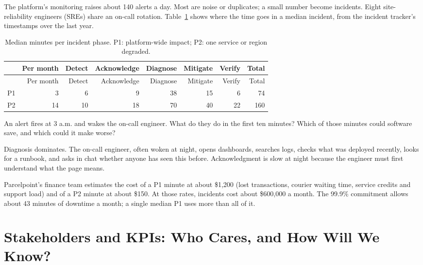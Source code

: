 The platform's monitoring raises about 140 alerts a day. Most are noise or duplicates; a small number become incidents. Eight site-reliability engineers (SREs) share an on-call rotation. Table~\ref{tab:inc-phases} shows where the time goes in a median incident, from the incident tracker's timestamps over the last year.

\begingroup
\small
\begin{longtable}{@{}lrrrrrrr@{}}
\caption{Median minutes per incident phase. P1: platform-wide impact; P2: one service or region degraded.}\label{tab:inc-phases}\\
\toprule
\rowcolor{coHead} & Per month & Detect & Acknowledge & Diagnose & Mitigate & Verify & Total \\
\midrule
\endfirsthead
\toprule
\rowcolor{coHead} & Per month & Detect & Acknowledge & Diagnose & Mitigate & Verify & Total \\
\midrule
\endhead
P1 & 3 & 6 & 9 & 38 & 15 & 6 & 74 \\
P2 & 14 & 10 & 18 & 70 & 40 & 22 & 160 \\
\bottomrule
\end{longtable}
\endgroup

\begin{thinkabout}
An alert fires at 3 a.m. and wakes the on-call engineer. What do they do in the first ten minutes? Which of those minutes could software save, and which could it make worse?
\end{thinkabout}

Diagnosis dominates. The on-call engineer, often woken at night, opens dashboards, searches logs, checks what was deployed recently, looks for a runbook, and asks in chat whether anyone has seen this before. Acknowledgment is slow at night because the engineer must first understand what the page means.

Parcelpoint's finance team estimates the cost of a P1 minute at about \$1{,}200 (lost transactions, courier waiting time, service credits and support load) and of a P2 minute at about \$150. At those rates, incidents cost about \$600{,}000 a month. The 99.9\% commitment allows about 43 minutes of downtime a month; a single median P1 uses more than all of it.

\section{Stakeholders and KPIs: Who Cares, and How Will We Know?}
\label{sec:inc-kpis}

